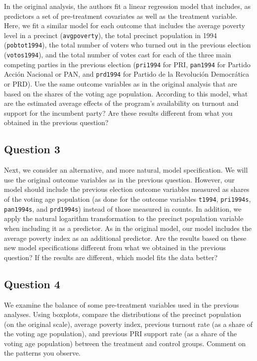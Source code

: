 \documentclass[]{article}
\begin{document}
In the original analysis, the authors fit a linear regression model that
includes, as predictors a set of pre-treatment covariates as well as the
treatment variable. Here, we fit a similar model for each outcome that
includes the average poverty level in a precinct (\texttt{avgpoverty}),
the total precinct population in 1994 (\texttt{pobtot1994}), the total
number of voters who turned out in the previous election
(\texttt{votos1994}), and the total number of votes cast for each of the
three main competing parties in the previous election (\texttt{pri1994}
for PRI, \texttt{pan1994} for Partido Acción Nacional or PAN, and
\texttt{prd1994} for Partido de la Revolución Democrática or PRD). Use
the same outcome variables as in the original analysis that are based on
the shares of the voting age population. According to this model, what
are the estimated average effects of the program's availability on
turnout and support for the incumbent party? Are these results different
from what you obtained in the previous question?

\subsection{Question 3}\label{question-3}

Next, we consider an alternative, and more natural, model specification.
We will use the original outcome variables as in the previous question.
However, our model should include the previous election outcome
variables measured as shares of the voting age population (as done for
the outcome variables \texttt{t1994}, \texttt{pri1994s},
\texttt{pan1994s}, and \texttt{prd1994s}) instead of those measured in
counts. In addition, we apply the natural logarithm transformation to
the precinct population variable when including it as a predictor. As in
the original model, our model includes the average poverty index as an
additional predictor. Are the results based on these new model
specifications different from what we obtained in the previous question?
If the results are different, which model fits the data better?

\subsection{Question 4}\label{question-4}

We examine the balance of some pre-treatment variables used in the
previous analyses. Using boxplots, compare the distributions of the
precinct population (on the original scale), average poverty index,
previous turnout rate (as a share of the voting age population), and
previous PRI support rate (as a share of the voting age population)
between the treatment and control groups. Comment on the patterns you
observe.
\end{document}

